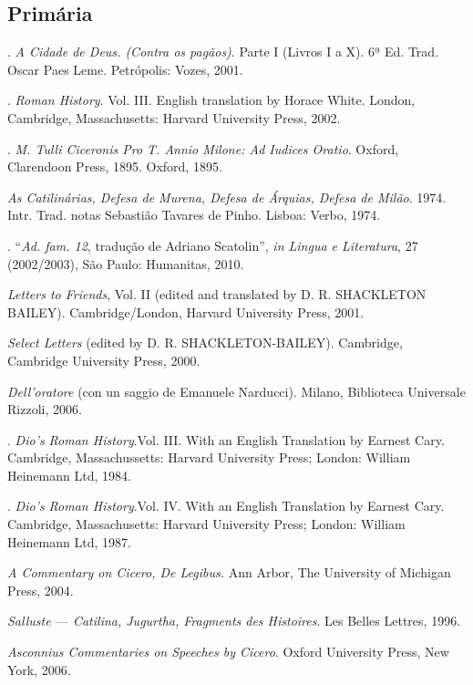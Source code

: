 \begin{bibliohedra}

\subsection{Primária}

. \emph{A Cidade de Deus. (Contra os pagãos)}. Parte I (Livros I a X). 6ª Ed. Trad. Oscar Paes Leme. Petrópolis: Vozes, 2001.

. \emph{Roman History}. Vol. III. English translation by Horace White. London, Cambridge, Massachusetts: Harvard University Press, 2002.

. \emph{M. Tulli Ciceronis Pro T. Annio Milone: Ad Iudices Oratio}. Oxford, Clarendoon Press, 1895. Oxford, 1895.


 \emph{As Catilinárias, Defesa de Murena, Defesa de Árquias, Defesa de Milão}. 1974. Intr. Trad. notas Sebastião Tavares de Pinho. Lisboa: Verbo, 1974.

. ``\emph{Ad. fam. 12}, tradução de Adriano Scatolin'', \emph{in Lingua e Literatura}, 27 (2002/2003), São Paulo: Humanitas, 2010.

 \emph{Letters to Friends}, Vol. II (edited and translated by D. R. SHACKLETON BAILEY). Cambridge/London, Harvard University Press, 2001.

 \emph{Select Letters} (edited by D. R. SHACKLETON-BAILEY). Cambridge, Cambridge University Press, 2000.

 \emph{Dell’oratore} (con un saggio de Emanuele Narducci). Milano, Biblioteca Universale Rizzoli, 2006.

.  \emph{Dio’s Roman History}.Vol. III. With an English Translation by Earnest Cary.  Cambridge, Massachussetts: Harvard University Press; London: William Heinemann Ltd, 1984. 

.   \emph{Dio’s Roman History}.Vol. IV. With an English Translation by Earnest Cary.  Cambridge, Massachusetts: Harvard University Press; London: William Heinemann Ltd, 1987. 

 \emph{A Commentary on Cicero, \emph{De Legibus}.} Ann Arbor, The University of Michigan Press, 2004.


 \emph{Salluste --- Catilina, Jugurtha, Fragments des Histoires}. Les Belles Lettres, 1996.

 \emph{Asconnius Commentaries on Speeches by Cicero}. Oxford University Press, New York, 2006.



\end{bibliohedra}
